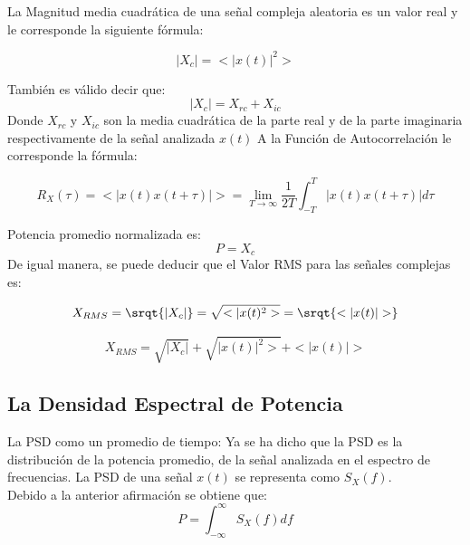 La Magnitud media cuadrática de una señal compleja aleatoria es un valor real y le corresponde la siguiente fórmula:

 	\begin{equation} \label{equ_veintiseis}
		 |X_{c}| = <|x(t)|^{2}> 
	\end{equation}

También es válido decir que:
 	\begin{equation} \label{equ_veintiseis}
		 |X_{c}| = X_{rc}+X_{ic} 
	\end{equation}
Donde $X_{rc}$ y $X_{ic}$ son la media cuadrática de la parte real y de la parte imaginaria respectivamente de la señal analizada $x(t)$
A la Función de Autocorrelación le corresponde la fórmula:

 \begin{equation} \label{equ_veintinueve}
	 R_{X}(\tau) = <|x(t) x(t + \tau)|> = \lim_{T \to \infty} \dfrac{1}{2T} \int_{-T}^{T} |x(t) x(t + \tau)| d\tau 
\end{equation}

Potencia promedio normalizada es:
 	\begin{equation} \label{equ_veintiseis}
		 P=X_{c} 
	\end{equation}
De igual manera, se puede deducir que el Valor RMS para las señales complejas es:

	 \begin{equation} \label{equ_veintisiete}
	 	X_{RMS} = \srqt{|X_{c}|} = \sqrt{<|x(t)^{2}>}=\srqt{<|x(t)|>} 
	\end{equation}

	 \begin{equation} \label{equ_veintiocho}
	 	X_{RMS} = \sqrt{|X_c|} + \sqrt{|x(t)|^{2}>} + <|x(t)|>
	\end{equation}

\subsection{La Densidad Espectral de Potencia}



La PSD como un promedio de tiempo: Ya se ha dicho que la PSD es la distribución de la potencia promedio, de la señal analizada en el espectro de frecuencias. La PSD de una señal $x(t)$ se representa como $S_{X}(f)$. \\

Debido a la anterior afirmación se obtiene que:\\ 

\begin{equation} \label{equ_treinta}
	P =  \int_{-\infty}^{\infty} S_{X}(f) df 
\end{equation}

